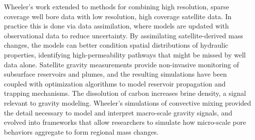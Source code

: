 Wheeler’s work extended to methods for combining high resolution, sparse coverage well bore data with low resolution, high coverage satellite data. In practice this is done via data assimilation, where models are updated with observational data to reduce uncertainty. By assimilating satellite-derived mass changes, the models can better condition spatial distributions of hydraulic properties, identifying high-permeability pathways that might be missed by well data alone. Satellite gravity measurements provide non-invasive monitoring of subsurface reservoirs and plumes, and the resulting simulations have been coupled with optimization algorithms to model reservoir propagation and trapping mechanisms. The dissolution of carbon increases brine density, a signal relevant to gravity modeling. Wheeler’s simulations of convective mixing provided the detail necessary to model and interpret macro-scale gravity signals, and evolved into frameworks that allow researchers to simulate how micro-scale pore behaviors aggregate to form regional mass changes. 
